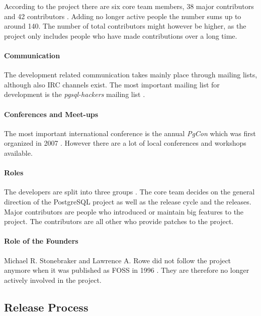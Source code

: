 According to the project there are six core team members, 38 major contributors
and 42 contributors \cite{PostgreSQLContributors}. Adding no longer active
people the number sums up to around 140. The number of total contributors might
however be higher, as the project only includes people who have made
contributions over a long time.

\paragraph{Communication}

The development related communication takes mainly place through mailing lists,
although also \ac{IRC} channels exist. The most important mailing list for
development is the \emph{pgsql-hackers} mailing list \cite{PostgreSQLDevFAQ}.

\paragraph{Conferences and Meet-ups}

The most important international conference is the annual \emph{PgCon} which
was first organized in 2007 \cite{PostgreSQLEvents}. However there are a lot of
local conferences and workshops available.

\paragraph{Roles}

The developers are split into three groups \cite{PostgreSQLContributors}. The
core team decides on the general direction of the PostgreSQL project as well as
the release cycle and the releases. Major contributors are people who
introduced or maintain big features to the project. The contributors are all
other who provide patches to the project.

\paragraph{Role of the Founders}

Michael R. Stonebraker and Lawrence A. Rowe did not follow the project anymore
when it was published as \ac{FOSS} in 1996 \cite{PostgreSQLHistory}. They are
therefore no longer actively involved in the project.

\subsection{Release Process}

